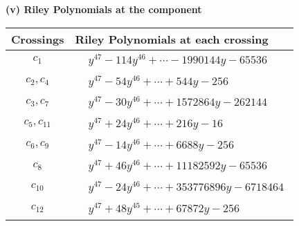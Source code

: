 \documentclass[1p]{elsarticle_modified}
\theoremstyle{definition}
\begin{document}
\newpage\renewcommand{\arraystretch}{1}
\flushleft \textbf{(v) Riley Polynomials at the component}\newline \\
\begin{tabular}{m{50pt}|m{274pt}}
Crossings & \hspace{64pt}Riley Polynomials at each crossing \\
\hline $$\begin{aligned}c_{1}\end{aligned}$$&$\begin{aligned}
&y^{47}-114 y^{46}+\cdots-1990144 y-65536
\end{aligned}$\\
\hline $$\begin{aligned}c_{2},c_{4}\end{aligned}$$&$\begin{aligned}
&y^{47}-54 y^{46}+\cdots+544 y-256
\end{aligned}$\\
\hline $$\begin{aligned}c_{3},c_{7}\end{aligned}$$&$\begin{aligned}
&y^{47}-30 y^{46}+\cdots+1572864 y-262144
\end{aligned}$\\
\hline $$\begin{aligned}c_{5},c_{11}\end{aligned}$$&$\begin{aligned}
&y^{47}+24 y^{46}+\cdots+216 y-16
\end{aligned}$\\
\hline $$\begin{aligned}c_{6},c_{9}\end{aligned}$$&$\begin{aligned}
&y^{47}-14 y^{46}+\cdots+6688 y-256
\end{aligned}$\\
\hline $$\begin{aligned}c_{8}\end{aligned}$$&$\begin{aligned}
&y^{47}+46 y^{46}+\cdots+11182592 y-65536
\end{aligned}$\\
\hline $$\begin{aligned}c_{10}\end{aligned}$$&$\begin{aligned}
&y^{47}-24 y^{46}+\cdots+353776896 y-6718464
\end{aligned}$\\
\hline $$\begin{aligned}c_{12}\end{aligned}$$&$\begin{aligned}
&y^{47}+48 y^{45}+\cdots+67872 y-256
\end{aligned}$\\
\hline
\end{tabular}\\~\\
\end{document}
